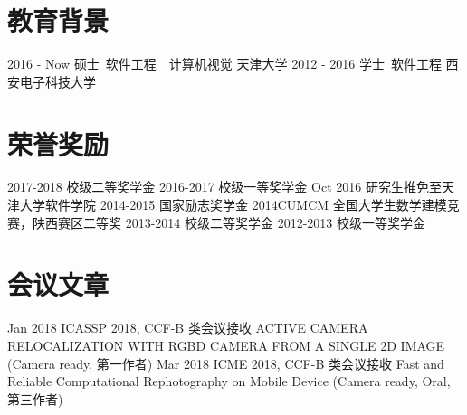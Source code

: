 \documentclass[utf8]{twentysecondcv} %
\begin{document}
\makeprofile %

\section{教育背景}

\begin{twentyshort}
    \twentyitemshort
        {2016 - Now}
        {硕士\ 软件工程\ \ 计算机视觉 \hfill{天津大学}}	
	\twentyitemshort
		{2012 - 2016}
		{学士\ 软件工程 \hfill{西安电子科技大学}}		
\end{twentyshort}


\section{荣誉奖励}

\begin{twentyshort}
    \twentyitemshort
        {2017-2018}
        {校级二等奖学金}
	\twentyitemshort
        {2016-2017}
        {校级一等奖学金}
	\twentyitemshort
		{Oct 2016}        
		{研究生推免至天津大学软件学院}
	\twentyitemshort
		{2014-2015}
		{国家励志奖学金}
	\twentyitemshort
		{2014CUMCM}
		{全国大学生数学建模竞赛，陕西赛区二等奖}
	\twentyitemshort
		{2013-2014}
		{校级二等奖学金}		
	\twentyitemshort
		{2012-2013}
		{校级一等奖学金}		
\end{twentyshort}        


\section{会议文章}

\begin{twenty}
    \twentyitem
        {Jan 2018}
        {}        
        {ICASSP 2018, CCF-B 类会议接收}
        {}
        {}
        {ACTIVE CAMERA RELOCALIZATION WITH RGBD CAMERA
FROM A SINGLE 2D IMAGE (Camera ready, 第一作者)}
    \twentyitem
        {Mar 2018}
        {}        
        {ICME 2018, CCF-B 类会议接收}
        {}
        {}
        {Fast and Reliable Computational Rephotography on Mobile Device (Camera ready, Oral, 第三作者)}
\end{twenty}
\end{document}
